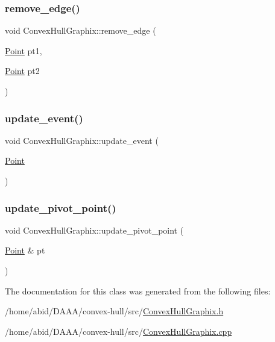\mbox{\label{class_convex_hull_graphix_a35c4a800c524d5ff2001d3724791bf66}} 
\subsubsection{\texorpdfstring{remove\_edge()}{remove\_edge()}\hspace{0.1cm}{\footnotesize\ttfamily [2/2]}}
{\footnotesize\ttfamily void Convex\+Hull\+Graphix\+::remove\+\_\+edge (\begin{DoxyParamCaption}\item[{\mbox{\hyperlink{class_point}{Point}}}]{pt1,  }\item[{\mbox{\hyperlink{class_point}{Point}}}]{pt2 }\end{DoxyParamCaption})}

\mbox{\label{class_convex_hull_graphix_a72101c075bb4fca0db552e888d1530b3}} 
\subsubsection{\texorpdfstring{update\_event()}{update\_event()}}
{\footnotesize\ttfamily void Convex\+Hull\+Graphix\+::update\+\_\+event (\begin{DoxyParamCaption}\item[{\mbox{\hyperlink{class_point}{Point}}}]{ }\end{DoxyParamCaption})}

\mbox{\label{class_convex_hull_graphix_a463b42e0cafea416fa9a193e5efed532}} 
\subsubsection{\texorpdfstring{update\_pivot\_point()}{update\_pivot\_point()}}
{\footnotesize\ttfamily void Convex\+Hull\+Graphix\+::update\+\_\+pivot\+\_\+point (\begin{DoxyParamCaption}\item[{\mbox{\hyperlink{class_point}{Point}} \&}]{pt }\end{DoxyParamCaption})}



The documentation for this class was generated from the following files\+:\begin{DoxyCompactItemize}
\item 
/home/abid/\+D\+A\+A\+A/convex-\/hull/src/\mbox{\hyperlink{_convex_hull_graphix_8h}{Convex\+Hull\+Graphix.\+h}}\item 
/home/abid/\+D\+A\+A\+A/convex-\/hull/src/\mbox{\hyperlink{_convex_hull_graphix_8cpp}{Convex\+Hull\+Graphix.\+cpp}}\end{DoxyCompactItemize}
